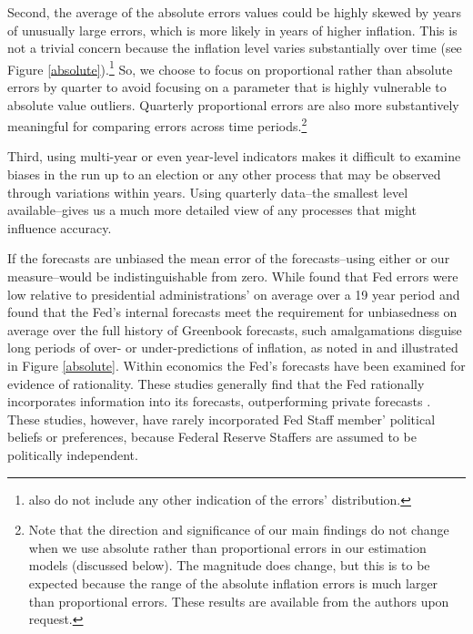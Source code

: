 \documentclass[a4paper]{article}
\begin{document}
Second, the average of the absolute errors values could be highly skewed by years of unusually large errors, which is more likely in years of higher inflation. This is not a trivial concern because the inflation level varies substantially over time (see Figure \ref{absolute}).\footnote{\cite{Frendreis2000} also do not include any other indication of the errors' distribution.} So, we choose to focus on proportional rather than absolute errors by quarter to avoid focusing on a parameter that is highly vulnerable to absolute value outliers. Quarterly proportional errors are also more substantively meaningful for comparing errors across time periods.\footnote{Note that the direction and significance of our main findings do not change when we use absolute rather than proportional errors in our estimation models (discussed below). The magnitude does change, but this is to be expected because the range of the absolute inflation errors is much larger than proportional errors. These results are available from the authors upon request.} 

Third, using multi-year or even year-level indicators makes it difficult to examine biases in the run up to an election or any other process that may be observed through variations within years. Using quarterly data--the smallest level available--gives us a much more detailed view of any processes that might influence accuracy.

If the forecasts are unbiased the mean error of the forecasts--using either \cite{Frendreis2000} or our measure--would be indistinguishable from zero. While \cite{Frendreis2000} found that Fed errors were low relative to presidential administrations' on average over a 19 year period and \cite{Romer2000} found that the Fed's internal forecasts meet the requirement for unbiasedness on average over the full history of Greenbook forecasts, such amalgamations disguise long periods of over- or under-predictions of inflation, as noted in \cite{Capistran2006} and illustrated in Figure \ref{absolute}. Within economics the Fed's forecasts have been examined for evidence of rationality. These studies generally find that the Fed rationally incorporates information into its forecasts, outperforming private forecasts \cite[c.f.][]{Gamber2009}. These studies, however, have rarely incorporated Fed Staff member' political beliefs or preferences, because Federal Reserve Staffers are assumed to be politically independent.
\end{document}
